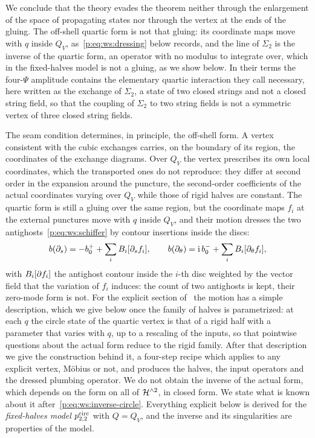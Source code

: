 We conclude that the theory evades the theorem neither through the enlargement of the space of propagating states nor through the vertex at the ends of the gluing.
The off-shell quartic form is not that gluing: its coordinate maps move with $q$ inside $Q_V$, as~\eqref{p:eq:ws:dressing} below records, and the line of $\Sigma_2$ is the inverse of the quartic form, an operator with no modulus to integrate over, which in the fixed-halves model is not a gluing, as we show below.
In their terms the four-$\Psi$ amplitude contains the elementary quartic interaction they call necessary, here written as the exchange of $\Sigma_2$, a state of two closed strings and not a closed string field, so that the coupling of $\Sigma_2$ to two string fields is not a symmetric vertex of three closed string fields.

The seam condition determines, in principle, the off-shell form.
A vertex consistent with the cubic exchanges carries, on the boundary of its region, the coordinates of the exchange diagrams.
  Over $Q_V$ the vertex prescribes its own local coordinates, which the transported ones do not reproduce: they differ at second order in the expansion around the puncture, the second-order coefficients of the actual coordinates varying over $Q_V$ while those of rigid halves are constant.
The quartic form is still a gluing over the same region, but the coordinate maps $f_i$ at the external punctures move with $q$ inside $Q_V$, and their motion dresses the two antighosts~\eqref{p:eq:ws:schiffer} by contour insertions inside the discs:
\begin{equation}
  \label{p:eq:ws:dressing}
  b(\partial_s)
    = - b_0^+ + \sum_{i} B_i[\partial_s f_i],
  \qquad
  b(\partial_\theta)
    = \mathrm{i} \, b_0^- + \sum_{i} B_i[\partial_\theta f_i],
\end{equation}
with $B_i[\partial f_i]$ the antighost contour inside the $i$-th disc weighted by the vector field that the variation of $f_i$ induces: the count of two antighosts is kept, their zero-mode form is not.
For the explicit section of~\cite{Erbin:2026:SL2CVerticesClosed} the motion has a simple description, which we give below once the family of halves is parametrized: at each $q$ the circle state of the quartic vertex is that of a rigid half with a parameter that varies with $q$, up to a rescaling of the inputs, so that pointwise questions about the actual form reduce to the rigid family.
After that description we give the construction behind it, a four-step recipe which applies to any explicit vertex, Möbius or not, and produces the halves, the input operators and the dressed plumbing operator.
We do not obtain the inverse of the actual form, which depends on the form on all of $\mathcal{H}^{\wedge 2}$, in closed form.
  We state what is known about it after~\eqref{p:eq:ws:inverse-circle}.
Everything explicit below is derived for the \emph{fixed-halves model} $p_{2,2}^{\mathrm{circ}}$ with $Q = Q_V$, and the inverse and its singularities are properties of the model.

